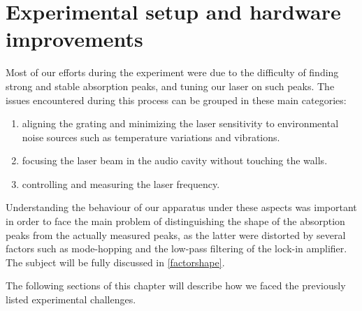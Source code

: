 \chapter{Experimental setup and hardware improvements}\label{chapter2}
Most of our efforts during the experiment were due to the difficulty of finding strong and stable absorption peaks, and tuning our laser on such peaks.
The issues encountered during this process can be grouped in these main categories:
\begin{enumerate} 
\item aligning the grating and minimizing the laser sensitivity to environmental noise sources such as temperature variations and vibrations.
\item focusing the laser beam in the audio cavity without touching the walls.
\item controlling and measuring the laser frequency.
\end{enumerate}
Understanding the behaviour of our apparatus under these aspects was important in order to face the main problem of distinguishing the shape of the absorption peaks from the actually measured peaks, as the latter were distorted by several factors such as mode-hopping and the low-pass filtering of the lock-in amplifier. The subject will be fully discussed in \cref{factorshape}.

\medskip
The following sections of this chapter will describe how we faced the previously listed experimental challenges.


